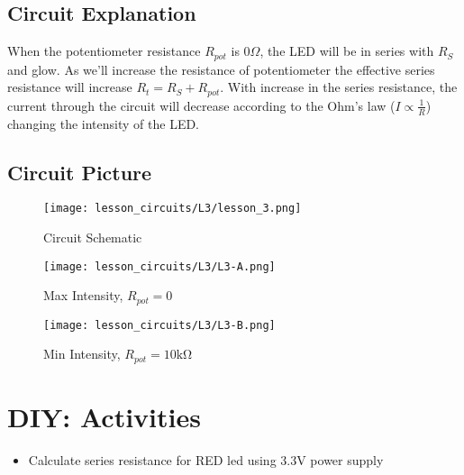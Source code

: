 \subsection{Circuit Explanation}
When the potentiometer resistance $R_{pot}$ is $0\Omega$, the LED will be in series with $R_S$ and glow. As we'll increase the resistance of potentiometer the effective series resistance will increase $R_t = R_S + R_{pot}$. With increase in the series resistance, the current through the circuit will decrease according to the Ohm's law ($I \propto \frac{1}{R}$) changing the intensity of the LED.
\subsection{Circuit Picture}
\begin{figure}[htp]
    \centering
    \texttt{[image: lesson\_circuits/L3/lesson\_3.png]}
    \caption{Circuit Schematic}
    \label{fig:pot_led_sch}
\end{figure}
\begin{figure}[htp]
    \centering
    \texttt{[image: lesson\_circuits/L3/L3-A.png]}
    \caption{Max Intensity, $R_{pot} = 0$}
    \label{fig:pot_led_max}
\end{figure}
\begin{figure}[htp]
    \centering
    \texttt{[image: lesson\_circuits/L3/L3-B.png]}
    \caption{Min Intensity, $R_{pot} = 10\si{\kilo\ohm}$}
    \label{fig:pot_led_min}
\end{figure}



\section{DIY: Activities}
\begin{itemize}
    \item Calculate series resistance for RED led using 3.3V power supply
\end{itemize}
